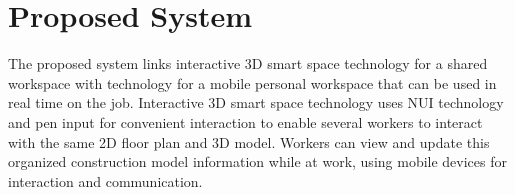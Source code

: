 
\section{Proposed System}


The proposed system links interactive 3D smart space technology for a shared workspace with technology for a mobile personal workspace that can be used in real time on the job. Interactive 3D smart space technology uses NUI technology and pen input for convenient interaction to enable several workers to interact with the same 2D floor plan and 3D model. Workers can view and update this organized construction model information while at work, using mobile devices for interaction and communication.

